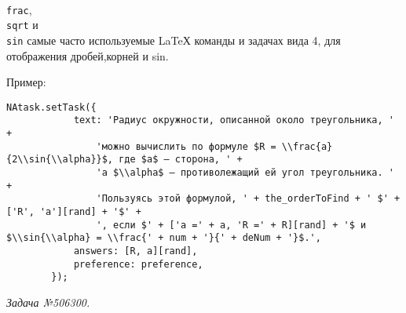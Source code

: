 \texttt{\\frac{}{}}, \texttt{\\sqrt{}} и \texttt{\\sin{}} 
самые часто используемые LaTeХ команды и задачах вида 4, для отображения дробей,корней и sin.

Пример:
\begin{lstlisting}
NAtask.setTask({
			text: 'Радиус окружности, описанной около треугольника, ' +
				'можно вычислить по формуле $R = \\frac{a}{2\\sin{\\alpha}}$, где $a$ – сторона, ' +
				'а $\\alpha$ – противолежащий ей угол треугольника. ' +
				'Пользуясь этой формулой, ' + the_orderToFind + ' $' + ['R', 'a'][rand] + '$' +
				', если $' + ['a =' + a, 'R =' + R][rand] + '$ и $\\sin{\\alpha} = \\frac{' + num + '}{' + deNum + '}$.',
			answers: [R, a][rand],
			preference: preference,
		});
\end{lstlisting}
\textsl{Задача №506300.}

